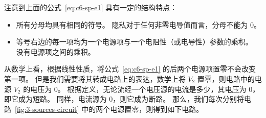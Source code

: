 注意到上面的公式~\ref{eq:c6-sp-e1} 具有一定的结构特点：
\begin{itemize}
  \item 所有分母均具有相同的符号。
    隐私对于任何非零电导值而言，分母不能为 0。
  \item 等号右边的每一项均为一个电源项与一个电阻性（或电导性）参数的乘积。
    没有电源项之间的乘积。
\end{itemize}

从数学上看，根据线性性质，将公式~\ref{eq:c6-sp-e1} 的后两个电源项置零不会改变第一项。
但是我们需要将其转成电路上的表达，数学上将 $V_2$ 置零，则电路中的电源 $V_2$ 的电压为 0。
根据定义，无论流经一个电压源的电流是多少，其电压为 0，即它成为短路。
同样，电流源为 0，则它成为断路。
那么，我们每次分别将电路~\ref{fig:3-sources-circuit} 中的两个电源置零，则得到如下电路。

